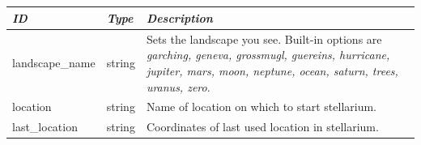 \subsection{}

\begin{tabularx}{\textwidth}{l|l|X}\toprule
\emph{ID} & \emph{Type} & \emph{Description}\\\midrule
landscape\_name   & string & Sets the landscape you see. Built-in options are \emph{garching, geneva, grossmugl, guereins, 
                             hurricane, jupiter, mars, moon, neptune, ocean, saturn, trees, uranus, zero}.\\%
location          & string & Name of location on which to start stellarium.\\%
last\_location    & string & Coordinates of last used location in stellarium.\\\bottomrule
\end{tabularx}

\subsection{}
\ifhtlatex
\else
\label{sec:configini:landscape}
\fi

